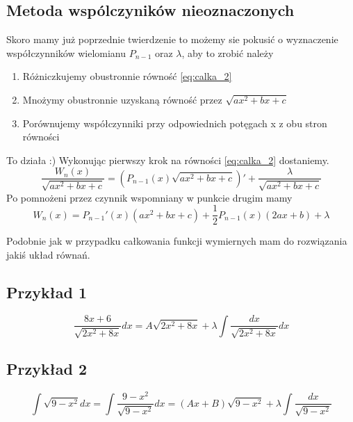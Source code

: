 \documentclass[11pt]{article}
\begin{document}
\subsection{Metoda wspólczyników nieoznaczonych}
Skoro mamy już poprzednie twierdzenie to możemy sie pokusić o wyznaczenie współczynników wielomianu $P_{n-1}$ oraz $\lambda$, aby to zrobić należy
\begin{enumerate}
\item{Różniczkujemy obustronnie równość \eqref{eq:calka_2}}
\item{Mnożymy obustronnie uzyskaną równość przez $ \sqrt{ax^2 + bx + c}$}
\item{Porównujemy współczynniki przy odpowiednich potęgach x z obu stron równości}
\end{enumerate}

To działa :)
Wykonując pierwszy krok na równości \eqref{eq:calka_2} dostaniemy.
$$ \frac{W_n(x)}{\sqrt{ax^2 + bx + c}} = \left(P_{n-1}(x)\sqrt{ax^2+bx+c}\right)' + \frac{\lambda}{\sqrt{ax^2+bx+c}} $$
Po pomnożeni przez  czynnik wspomniany w punkcie drugim mamy
$$W_n(x) = P_{n-1}'(x)(ax^2 + bx + c) + \frac{1}{2}P_{n-1}(x)(2ax+b) + \lambda $$

Podobnie jak w przypadku całkowania funkcji wymiernych mam do rozwiązania jakiś układ równań.

\subsection{Przykład 1}
$$ \frac{8x + 6}{\sqrt{2x^2 + 8x}}dx = A \sqrt{2x^2 + 8x} + \lambda \int \frac{dx}{\sqrt{2x^2 + 8x}}dx $$
\subsection{Przykład 2}
$$ \int \sqrt{9 - x^2}dx = \int \frac{9 - x^2}{\sqrt{9-x^2}} dx = (Ax + B)\sqrt{9-x^2} + \lambda \int \frac{dx}{\sqrt{9-x^2}}$$
\end{document}

